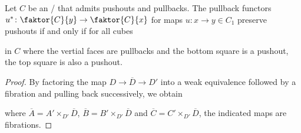 \begin{lemma}\label{lem:univForPushouts}
    Let $C$ be an \inftycat/ that admits pushouts and pullbacks.
    The pullback functors $u^*\colon\faktor{C}{y}\to\faktor{C}{x}$ for maps $u\colon x\to y\in C_1$ preserve pushouts if and only if for all cubes
    \begin{center}
    \end{center}
    in $C$ where the vertial faces are pullbacks and the bottom square is a pushout, the top square is also a pushout.
    \begin{proof}
        By factoring the map $D\to\overline{D}\to D'$ into a weak equivalence followed by a fibration and pulling back successively, we obtain 
        \begin{center}
        \end{center}
        where $\overline{A}=A'\times_{D'}\overline{D}$, $\overline{B}=B'\times_{D'}\overline{D}$ and $\overline{C}=C'\times_{D'}\overline{D}$, the indicated maps are fibrations.

\end{proof}
\end{lemma}
